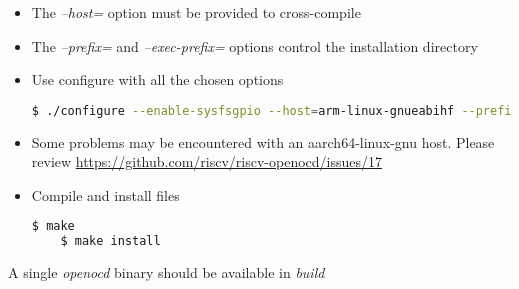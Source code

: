 \documentclass{article}
\begin{document}
\begin{itemize}
    \item The \textit{--host=} option must be provided to cross-compile
    
    \item The \textit{--prefix=} and \textit{--exec-prefix=} options control the installation directory
    
    \item Use configure with all the chosen options
    
    \begin{lstlisting}[language=bash]
    $ ./configure --enable-sysfsgpio --host=arm-linux-gnueabihf --prefix=/home/abouvier/Documents/riscv-openocd/build --exec-prefix=/home/abouvier/Documents/riscv-openocd/build
    \end{lstlisting}
    
    \item Some problems may be encountered with an aarch64-linux-gnu host. Please review \url{https://github.com/riscv/riscv-openocd/issues/17}
    
    \item Compile and install files
    
    \begin{lstlisting}[language=bash]
    $ make
    $ make install
    \end{lstlisting}
    
    \end{itemize}
    
    A single \textit{openocd} binary should be available in \textit{build}
    
\end{document}
